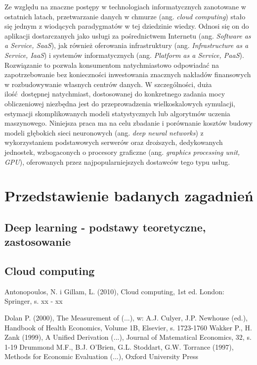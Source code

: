 \documentclass[12pt,a4paper,twoside]{article}
\begin{document}
Ze względu na znaczne postępy w technologiach informatycznych zanotowane w ostatnich latach, przetwarzanie danych w chmurze (ang. \textit{cloud computing}) stało się jednym z wiodących paradygmatów w tej dziedzinie wiedzy. Odnosi się on do aplikacji dostarczanych jako usługi za pośrednictwem Internetu (ang. \textit{Software as a Service, SaaS}), jak również oferowania infrastruktury (ang. \textit{Infrastructure as a Service, IaaS}) i systemów informatycznych (ang. \textit{Platform as a Service, PaaS}). Rozwiązanie to pozwala konsumentom natychmiastowo odpowiadać na zapotrzebowanie bez konieczności inwestowania znacznych nakładów finansowych w rozbudowywanie własnych centrów danych. W szczególności, duża ilość dostępnej natychmiast, dostosowanej do konkretnego zadania mocy obliczeniowej niezbędna jest do przeprowadzenia wielkoskalowych symulacji, estymacji skomplikowanych modeli statystycznych lub algorytmów uczenia maszynowego. Niniejsza praca ma na celu zbadanie i porównanie kosztów budowy modeli głębokich sieci neuronowych (ang. \textit{deep neural networks}) z wykorzystaniem podstawowych serwerów oraz droższych, dedykowanych jednostek, wzbogaconych o procesory graficzne (ang. \textit{graphics processing unit, GPU}), oferowanych przez najpopularniejszych dostawców tego typu usług.



\clearpage

\section{Przedstawienie badanych zagadnień}

\subsection{Deep learning - podstawy teoretyczne, zastosowanie}

\clearpage

\subsection{Cloud computing}

\clearpage

\begin{thebibliography}{99}
\setlength{\itemsep}{0pt}%
 Antonopoulos, N. i Gillam, L. (2010), Cloud computing, 1st ed. London: Springer, s. xx - xx


 Dolan P. (2000), The Measurement of (...), w: A.J. Culyer, J.P. Newhouse (ed.), Handbook of Health Economics, Volume 1B, Elsevier, s. 1723-1760
 Wakker P., H. Zank (1999), A Unified Derivation (...), Journal of  Matematical Economics, 32, s. 1-19
 Drummond M.F., B.J. O'Brien, G.L. Stoddart, G.W. Torrance (1997),       Methods for Economic Evaluation (...), Oxford University Press
\end{thebibliography}

\clearpage

\listoffigures

\clearpage

\listoftables

\clearpage
\end{document}
